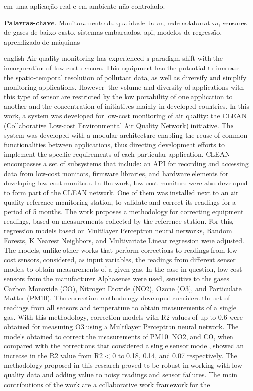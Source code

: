 \begin{resumo}
em uma aplicação real e em ambiente não controlado.
	
	\textbf{Palavras-chave}: Monitoramento da qualidade do ar, rede colaborativa, sensores de gases de baixo custo, sistemas embarcados, \acrshort{api}, modelos de regressão, aprendizado de máquinas
\end{resumo}

\begin{resumo}[Abstract]
	\SingleSpacing
	\begin{otherlanguage*}{english}
		Air quality monitoring has experienced a paradigm shift with the incorporation of low-cost sensors. This equipment has the potential to increase the spatio-temporal resolution of pollutant data, as well as diversify and simplify monitoring applications. However, the volume and diversity of applications with this type of sensor are restricted by the low portability of one application to another and the concentration of initiatives mainly in developed countries. In this work, a system was developed for low-cost monitoring of air quality: the CLEAN (Collaborative Low-cost Environmental Air Quality Network) initiative. The system was developed with a modular architecture enabling the reuse of common functionalities between applications, thus directing development efforts to implement the specific requirements of each particular application. CLEAN encompasses a set of subsystems that include: an API for recording and accessing data from low-cost monitors, firmware libraries, and hardware elements for developing low-cost monitors. In the work, low-cost monitors were also developed to form part of the CLEAN network. One of them was installed next to an air quality reference monitoring station, to validate and correct its readings for a period of 5 months. The work proposes a methodology for correcting equipment readings, based on measurements collected by the reference station. For this, regression models based on Multilayer Perceptron neural networks, Random Forests, K Nearest Neighbors, and Multivariate Linear regression were adjusted. The models, unlike other works that perform corrections to readings from low-cost sensors, considered, as input variables, the readings from different sensor models to obtain measurements of a given gas. In the case in question, low-cost sensors from the manufacturer Alphasense were used, sensitive to the gases Carbon Monoxide (CO), Nitrogen Dioxide (NO2), Ozone (O3), and Particulate Matter (PM10). The correction methodology developed considers the set of readings from all sensors and temperature to obtain measurements of a single gas. With this methodology, correction models with R2 values of up to 0.6 were obtained for measuring O3 using a Multilayer Perceptron neural network. The models obtained to correct the measurements of PM10, NO2, and CO, when compared with the corrections that considered a single sensor model, showed an increase in the R2 value from R2 < 0 to 0.18, 0.14, and 0.07 respectively. The methodology proposed in this research proved to be robust in working with low-quality data and adding value to noisy readings and sensor failures. The main contributions of the work are a collaborative work framework for the 
\end{otherlanguage*}
\end{resumo}
